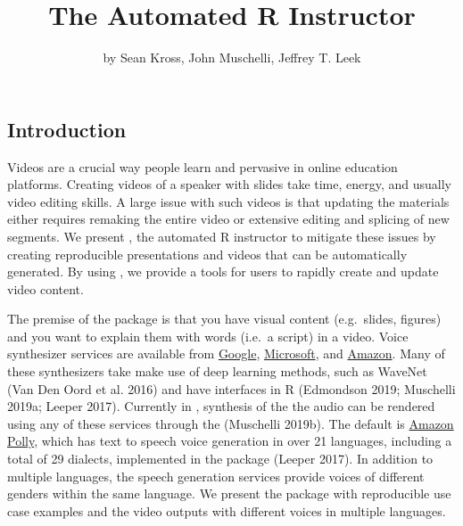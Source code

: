 \title{The Automated R Instructor}
\author{by Sean Kross, John Muschelli, Jeffrey T. Leek}

\maketitle



\hypertarget{introduction}{%
\subsection{Introduction}\label{introduction}}

Videos are a crucial way people learn and pervasive in online education
platforms. Creating videos of a speaker with slides take time, energy,
and usually video editing skills. A large issue with such videos is that
updating the materials either requires remaking the entire video or
extensive editing and splicing of new segments. We present
, the automated R instructor to mitigate these issues by
creating reproducible presentations and videos that can be automatically
generated. By using , we provide a tools for users to rapidly
create and update video content.

The premise of the  package is that you have visual content
(e.g.~slides, figures) and you want to explain them with words (i.e.~a
script) in a video. Voice synthesizer services are available from
\href{https://cloud.google.com/text-to-speech/}{Google},
\href{https://azure.microsoft.com/en-us/services/cognitive-services/text-to-speech/}{Microsoft},
and \href{https://aws.amazon.com/polly/}{Amazon}. Many of these
synthesizers take make use of deep learning methods, such as WaveNet
(Van Den Oord et al. 2016) and have interfaces in R (Edmondson 2019;
Muschelli 2019a; Leeper 2017). Currently in , synthesis of the
the audio can be rendered using any of these services through the
 (Muschelli 2019b). The default is
\href{https://aws.amazon.com/polly/}{Amazon Polly}, which has text to
speech voice generation in over 21 languages, including a total of 29
dialects, implemented in the  package (Leeper 2017).
In addition to multiple languages, the speech generation services
provide voices of different genders within the same language. We present
the  package with reproducible use case examples and the video
outputs with different voices in multiple languages.

